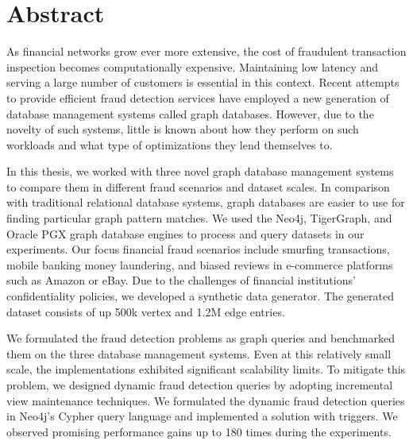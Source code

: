 \vfill
\selectenglish

\chapter*{Abstract}

As financial networks grow ever more extensive, the cost of fraudulent transaction inspection becomes computationally expensive.
Maintaining low latency and serving a large number of customers is essential in this context.
Recent attempts to provide efficient fraud detection services have employed a new generation of database management systems called graph databases.
However, due to the novelty of such systems, little is known about how they perform on such workloads and what type of optimizations they lend themselves to.

In this thesis, we worked with three novel graph database management systems to compare them in different fraud scenarios and dataset scales.
In comparison with traditional relational database systems, graph databases are easier to use for finding particular graph pattern matches.
We used the Neo4j, TigerGraph, and Oracle PGX graph database engines to process and query datasets in our experiments.
Our focus financial fraud scenarios include
smurfing transactions,
mobile banking money laundering, and
biased reviews in e-commerce platforms such as Amazon or eBay.
Due to the challenges of financial institutions' confidentiality policies, we developed a synthetic data generator. The generated dataset consists of up 500k vertex and 1.2M edge entries.

We formulated the fraud detection problems as graph queries and benchmarked them on the three database management systems. Even at this relatively small scale, the implementations exhibited significant scalability limits.
To mitigate this problem, we designed dynamic fraud detection queries by adopting incremental view maintenance techniques.
We formulated the dynamic fraud detection queries in Neo4j's Cypher query language and implemented a solution with triggers.
We observed promising performance gains up to 180 times during the experiments.

\vfill
\selectthesislanguage

\setcounter{romanPage}{\value{page}}
